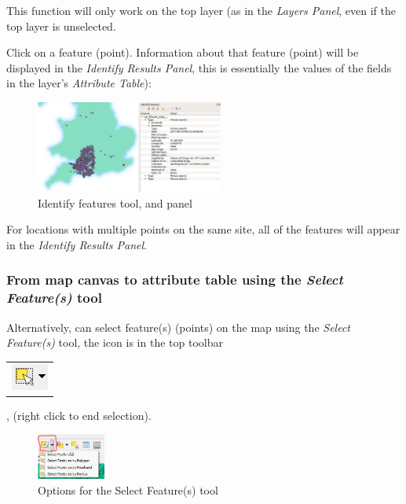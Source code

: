 This function will only work on the top layer (as in the \textit{Layers Panel}, even if the top layer is unselected.

Click on a feature (point). Information about that feature (point) will be displayed in the \textit{Identify Results Panel}, this is essentially the values of the fields in the layer's \textit{Attribute Table}):  

\begin{figure}[!h]
	\centering
	\includegraphics[width=0.55\textwidth]{images/stop_search_identify_feature.png}%
	\caption{Identify features tool, and panel}
	\label{ft_fig_firstfig3}
\end{figure}

For locations with multiple points on the same site, all of the features will appear in the \textit{Identify Results Panel}.

\subsubsection{From map canvas to attribute table using the \textit{Select Feature(s)} tool}

Alternatively, can select feature(s) (points) on the map using the \textit{Select Feature(s)} tool, the icon is in the top toolbar
\begin{tabular}{@{}c@{}}\includegraphics[width=4ex]{images/select_features_by_polygon_icon.png}\end{tabular}
, (right click to end selection).

\begin{figure}[!h]
	\centering
	\includegraphics[width=0.2\textwidth]{images/select_features_by_polygon_dropdown.png}
	\caption{Options for the Select Feature(s) tool}
	\label{ft_fig_firstfig3}
\end{figure}


